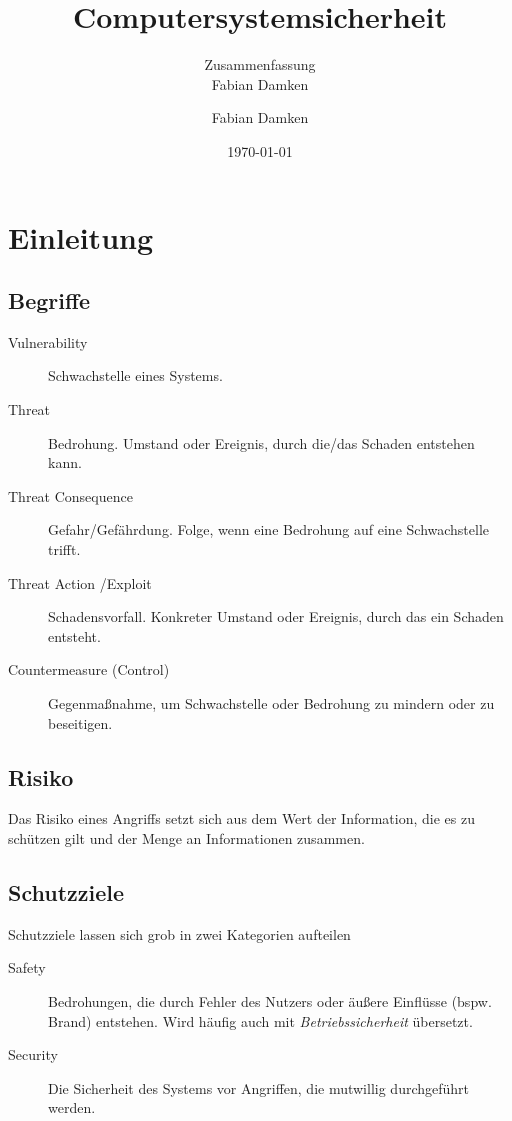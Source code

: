 \documentclass[a4paper, 11pt, accentcolor = tud3b]{tudreport}
\title{Computersystemsicherheit}
\subtitle{Zusammenfassung \\ Fabian Damken}
\author{Fabian Damken}
\date{\today}
\begin{document}
    \maketitle
    \tableofcontents
    \listoftodos

    \chapter{Einleitung} %
	    \begin{figure}[H]
	    	\centering
	    \end{figure}

        \section{Begriffe}
            \begin{description}
            	\item[Vulnerability] Schwachstelle eines Systems.
            	\item[Threat] Bedrohung. Umstand oder Ereignis, durch die/das Schaden entstehen kann.
            	\item[Threat Consequence] Gefahr/Gefährdung. Folge, wenn eine Bedrohung auf eine Schwachstelle trifft.
            	\item[Threat Action /Exploit] Schadensvorfall. Konkreter Umstand oder Ereignis, durch das ein Schaden entsteht.
            	\item[Countermeasure (Control)] Gegenmaßnahme, um Schwachstelle oder Bedrohung zu mindern oder zu beseitigen.
            \end{description}

        \section{Risiko}
            Das Risiko eines Angriffs setzt sich aus dem Wert der Information, die es zu schützen gilt und der Menge an Informationen zusammen.

        \section{Schutzziele}
	        Schutzziele lassen sich grob in zwei Kategorien aufteilen
	        \begin{description}
	        	\item[Safety] Bedrohungen, die durch Fehler des Nutzers oder äußere Einflüsse (bspw. Brand) entstehen. Wird häufig auch mit \textit{Betriebssicherheit} übersetzt.
	        	\item[Security] Die Sicherheit des Systems vor Angriffen, die mutwillig durchgeführt werden.
	        \end{description}
    
\end{document}
